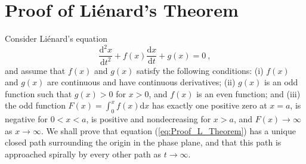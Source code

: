 \documentclass[12pt,a4paper]{article}
\newcommand{\dif}{\mathrm{d}}
\begin{document}
\section{Proof of Li\'enard's Theorem}
\cite{george1991differential, simmons2016differential} Consider Li\'enard's equation
\begin{equation}
\dfrac{\dif^2 x}{\dif t^2} +f(x) \dfrac{\dif x}{\dif t} +g(x) = 0 ~,
\label{eq:Proof_L_Theorem}
\end{equation}
and assume that $f(x)$ and $g(x)$ satisfy the following conditions: (i) $f(x)$ and $g(x)$ are continuous and have continuous derivatives; (ii) $g(x)$ is an odd function such that $g(x) > 0$ for $x > 0$, and $f(x)$ is an even function; and (iii) the odd function $F(x) = \int_0^x f(x) \dif x$ has exactly one positive zero at $x=a$, is negative for $0 < x < a$, is positive and nondecreasing for $x > a$, and $F(x) \rightarrow \infty$ as $x \rightarrow \infty$. We shall prove that equation (\ref{eq:Proof_L_Theorem}) has a unique closed path surrounding the origin in the phase plane, and that this path is approached spirally by every other path as $t \rightarrow \infty$.
\end{document}
